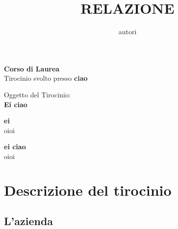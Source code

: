 \documentclass[a4paper, 12pt]{article}
\title{\textbf{RELAZIONE}}
\author{autori}
\date{}
\begin{document}
\maketitle

\begin{center}
    \textbf{Corso di Laurea}\\
    \vspace{1cm}
    Tirocinio svolto presso \textbf{ciao}\\
    \vspace{2cm} %
    
    Oggetto del Tirocinio:\\
    \vspace{0.3cm}
    \textbf{\large Ei ciao}\\
\end{center}

\vspace{40mm}
\par
\noindent
\begin{minipage}[t]{0.47\textwidth}
{\large{\textbf{ei} \\
oioi}}
\end{minipage}
\hfill
\begin{minipage}[t]{0.47\textwidth}\raggedleft
{\large{\textbf{ei ciao} \\
oioi}}
\end{minipage}

\date{}

\newpage

\section{Descrizione del tirocinio}
\subsection{L'azienda}
\end{document}
